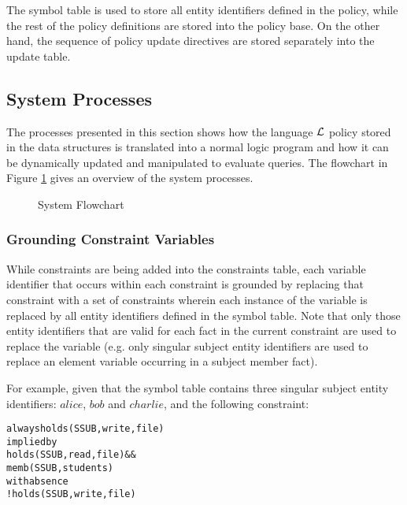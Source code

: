 \documentclass[11pt, twocolumn]{article}
\newenvironment{vverbatim}
  {\begin{alltt}}
  {\vspace{-\baselineskip}\end{alltt}}
\begin{document}
        The symbol table is used to store all entity identifiers defined in the
        policy, while the rest of the policy definitions are stored into the
        policy base. On the other hand, the sequence of policy update
        directives are stored separately into the update table.

    \subsection{System Processes}

      The processes presented in this section shows how the language
      ${\cal L}$ policy stored in the data structures is translated into a
      normal logic program and how it can be dynamically updated and
      manipulated to evaluate queries. The flowchart in Figure \ref{fig-2}
      gives an overview of the system processes.

      \begin{figure}[ht]
        \begin{center}
          \caption{System Flowchart}
          \label{fig-2}
        \end{center}
      \end{figure}

      \subsubsection{Grounding Constraint Variables}

        While constraints are being added into the constraints table, each
        variable identifier that occurs within each constraint is grounded by
        replacing that constraint with a set of constraints wherein each
        instance of the variable is replaced by all entity identifiers defined
        in the symbol table. Note that only those entity identifiers that are
        valid for each fact in the current constraint are used to replace the
        variable (e.g. only singular subject entity identifiers are used to
        replace an element variable occurring in a subject member fact).

        For example, given that the symbol table contains three singular
        subject entity identifiers: $alice$, $bob$ and $charlie$, and the
        following constraint:

        \begin{vverbatim}
  always holds(SSUB, write, file)
    implied by
      holds(SSUB, read, file) &&
      memb(SSUB, students)
    with absence
      !holds(SSUB, write, file)
        \end{vverbatim}
\end{document}
